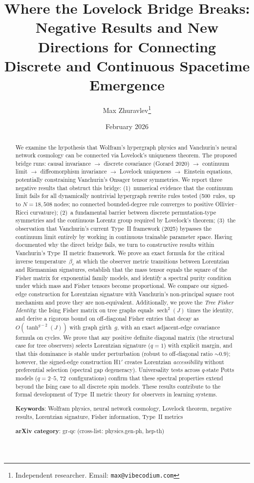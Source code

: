 \documentclass[11pt]{article}
\title{Where the Lovelock Bridge Breaks:\\
Negative Results and New Directions for Connecting\\
Discrete and Continuous Spacetime Emergence}
\author{Max Zhuravlev\thanks{Independent researcher. Email: \texttt{max@vibecodium.com}}}
\date{February 2026}
\theoremstyle{definition}
\theoremstyle{remark}
\begin{document}
\maketitle

\begin{abstract}
We examine the hypothesis that Wolfram's hypergraph physics and Vanchurin's
neural network cosmology can be connected via Lovelock's uniqueness theorem.
The proposed bridge runs: causal invariance $\to$ discrete covariance (Gorard 2020)
$\to$ continuum limit $\to$ diffeomorphism invariance $\to$ Lovelock uniqueness $\to$
Einstein equations, potentially constraining Vanchurin's Onsager tensor symmetries.
We report three negative results that obstruct this bridge:
(1)~numerical evidence that the continuum limit fails for all dynamically
nontrivial hypergraph rewrite rules tested (500~rules, up to
$N = 18{,}508$ nodes; no connected bounded-degree rule converges to
positive Ollivier--Ricci curvature);
(2)~a fundamental barrier between discrete permutation-type symmetries and the
continuous Lorentz group required by Lovelock's theorem;
(3)~the observation that Vanchurin's current Type~II framework (2025)
bypasses the continuum limit entirely by working in continuous trainable
parameter space.
Having documented why the direct bridge fails, we turn to constructive results
within Vanchurin's Type~II metric framework.
We prove an exact formula for the critical inverse temperature~$\beta_c$ at
which the observer metric transitions between Lorentzian and Riemannian
signatures, establish that the mass tensor equals the square of the Fisher
matrix for exponential family models, and identify a spectral purity condition
under which mass and Fisher tensors become proportional.
We compare our signed-edge construction for Lorentzian signature with
Vanchurin's non-principal square root mechanism and prove they are
non-equivalent.
Additionally, we prove the \emph{Tree Fisher Identity}: the Ising Fisher
matrix on tree graphs equals $\operatorname{sech}^2(J)$ times the identity,
and derive a rigorous bound on off-diagonal Fisher entries that decay as
$O(\tanh^{g-2}(J))$ with graph girth~$g$, with an exact adjacent-edge
covariance formula on cycles.
We prove that any positive definite diagonal matrix (the structural
case for tree observers) selects Lorentzian signature ($q = 1$) with
explicit margin, and that this dominance is stable under perturbation
(robust to off-diagonal ratio ${\sim}0.9$); however, the signed-edge
construction H1$'$ creates Lorentzian \emph{accessibility} without
preferential selection (spectral gap degeneracy).
Universality tests across $q$-state Potts models ($q = 2$--$5$,
72~configurations) confirm that these spectral properties extend beyond
the Ising case to all discrete spin models.
These results contribute to the formal development of Type~II metric theory
for observers in learning systems.

\medskip
\noindent\textbf{Keywords}: Wolfram physics, neural network cosmology,
Lovelock theorem, negative results, Lorentzian signature, Fisher information,
Type~II metrics

\medskip
\noindent\textbf{arXiv category}: gr-qc (cross-list: physics.gen-ph, hep-th)
\end{abstract}
\end{document}
